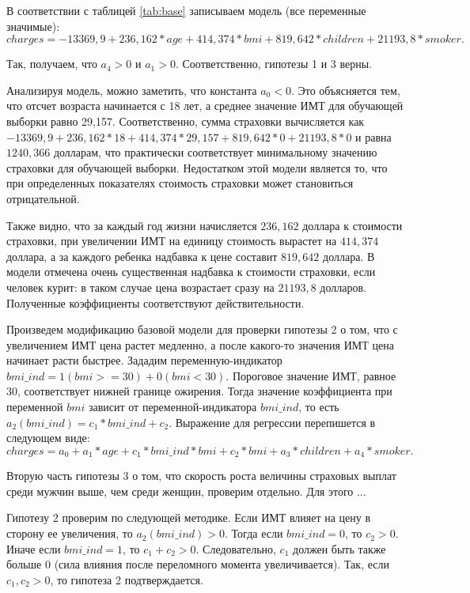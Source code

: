 \documentclass[a4paper,12pt]{article}
\begin{document}
В соответствии с таблицей \ref{tab:base} записываем модель (все переменные значимые):
\[charges = -13369,9 + 236,162 * age + 414,374 * bmi + 819,642 * children + 21193,8 * smoker.\]

Так, получаем, что $a_4 > 0$ и $a_1 > 0$. Соответственно, гипотезы 1 и 3 верны.

Анализируя модель, можно заметить, что константа $a_0 < 0$. Это объясняется тем, что отсчет возраста начинается с 18 лет, а среднее значение ИМТ для обучающей выборки равно 29,157. Соответственно, сумма страховки вычисляется как $-13369,9 + 236,162 * 18 + 414,374 * 29,157 + 819,642 * 0 + 21193,8 * 0$ и равна $1240,366$ долларам, что практически соответствует минимальному значению страховки для обучающей выборки. Недостатком этой модели является то, что при определенных показателях стоимость страховки может становиться отрицательной.

Также видно, что за каждый год жизни начисляется $236,162$ доллара к стоимости страховки, при увеличении ИМТ на единицу стоимость вырастет на $414,374$ доллара, а за каждого ребенка надбавка к цене составит $819,642$ доллара. В модели отмечена очень существенная надбавка к стоимости страховки, если человек курит: в таком случае цена возрастает сразу на $21193,8$ долларов. Полученные коэффициенты соответствуют действительности.

Произведем модификацию базовой модели для проверки гипотезы 2 о том, что с увеличением ИМТ цена растет медленно, а после какого-то значения ИМТ цена начинает расти быстрее. Зададим переменную-индикатор $bmi\_ind = 1 (bmi >= 30) + 0 (bmi < 30)$. Пороговое значение ИМТ, равное 30, соответствует нижней границе ожирения. Тогда значение коэффициента при переменной $bmi$ зависит от переменной-индикатора $bmi\_ind$, то есть $a_2(bmi\_ind) = c_1 * bmi\_ind + c_2$. Выражение для регрессии перепишется в следующем виде:
\[charges = a_0 + a_1 * age + c_1 * bmi\_ind * bmi + c_2 * bmi + a_3 * children + a_4 * smoker.\]

Вторую часть гипотезы 3 о том, что скорость роста величины страховых выплат среди мужчин выше, чем среди женщин, проверим отдельно. Для этого ...

Гипотезу 2 проверим по следующей методике. Если ИМТ влияет на цену в сторону ее увеличения, то $a_2(bmi\_ind) > 0$. Тогда если $bmi\_ind = 0$, то $c_2 > 0$. Иначе если $bmi\_ind = 1$, то $c_1 + c_2 > 0$. Следовательно, $c_1$ должен быть также больше 0 (сила влияния после переломного момента увеличивается). Так, если $c_1, c_2 > 0$, то гипотеза 2 подтверждается.
\end{document}
